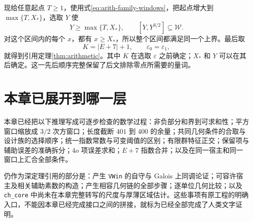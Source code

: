 现给任意起点 $T\ge1$，使用式\eqref{eq:arith-family-windows}，把起点增大到 $\max\{T,X_*\}$，选取 $Y$ 使
\[
Y\ge\max\{T,X_*\},
\qquad[Y,Y^{3/2}]\subseteq\mathcal W.
\]
对这个区间内的每个 $x$，都有 $x\ge X_*$，所以整个区间都满足同一个上界。最后取
\[
K=|E+7|+1,\qquad\varepsilon_0=\varepsilon_1,
\]
就得到引用定理\ref{thm:arithmetic}。其中 $K$ 在选取 $\varepsilon$ 之前确定；$X_*$ 和 $Y$ 可以在其后确定。这一先后顺序完整保留了后文排除零点所需要的量词。

\section{本章已展开到哪一层}
本章已经把以下推理写成可逐步检查的数学过程：非负部分和界到可求和性；平方窗口缩放成 $3/2$ 次方窗口；长度截断 $401$ 到 $400$ 的余量；共同几何条件的合取与设计族的选择顺序；统一指数常数与可变阈值的区别；有限群特征正交；保留项与辅助误差的准确拆分；$4o$ 项误差求和；$E+7$ 指数合并；以及在同一宿主和同一窗口上汇合全部条件。

仍作为深定理引用的部分是：产生 \texttt{VWin} 的自守与 Galois 上同调论证；可容许宿主及相关辅助素数的构造；产生相容几何链的全部步骤；逐单位几何比较；以及 \texttt{ch\_core} 中尚未在本章完整转写的尺度与厚薄区域估计。这些事项有原工程的明确入口，不能因本章已经完成接口之间的拼接，就标为已经全部完成了人类文字证明。
